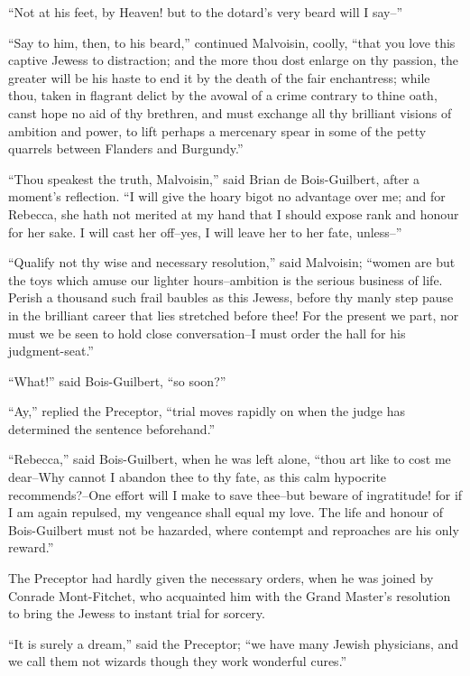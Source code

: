``Not at his feet, by Heaven! but to the dotard's very beard will I
say--''

``Say to him, then, to his beard,'' continued Malvoisin, coolly, ``that
you love this captive Jewess to distraction; and the more thou dost
enlarge on thy passion, the greater will be his haste to end it by the
death of the fair enchantress; while thou, taken in flagrant delict by
the avowal of a crime contrary to thine oath, canst hope no aid of thy
brethren, and must exchange all thy brilliant visions of ambition and
power, to lift perhaps a mercenary spear in some of the petty quarrels
between Flanders and Burgundy.''

``Thou speakest the truth, Malvoisin,'' said Brian de Bois-Guilbert,
after a moment's reflection. ``I will give the hoary bigot no advantage
over me; and for Rebecca, she hath not merited at my hand that I should
expose rank and honour for her sake. I will cast her off--yes, I will
leave her to her fate, unless--''

``Qualify not thy wise and necessary resolution,'' said Malvoisin;
``women are but the toys which amuse our lighter hours--ambition is the
serious business of life. Perish a thousand such frail baubles as this
Jewess, before thy manly step pause in the brilliant career that lies
stretched before thee! For the present we part, nor must we be seen to
hold close conversation--I must order the hall for his judgment-seat.''

``What!'' said Bois-Guilbert, ``so soon?''

``Ay,'' replied the Preceptor, ``trial moves rapidly on when the judge
has determined the sentence beforehand.''

``Rebecca,'' said Bois-Guilbert, when he was left alone, ``thou art like
to cost me dear--Why cannot I abandon thee to thy fate, as this calm
hypocrite recommends?--One effort will I make to save thee--but beware
of ingratitude! for if I am again repulsed, my vengeance shall equal my
love. The life and honour of Bois-Guilbert must not be hazarded, where
contempt and reproaches are his only reward.''

The Preceptor had hardly given the necessary orders, when he was joined
by Conrade Mont-Fitchet, who acquainted him with the Grand Master's
resolution to bring the Jewess to instant trial for sorcery.

``It is surely a dream,'' said the Preceptor; ``we have many Jewish
physicians, and we call them not wizards though they work wonderful
cures.''

